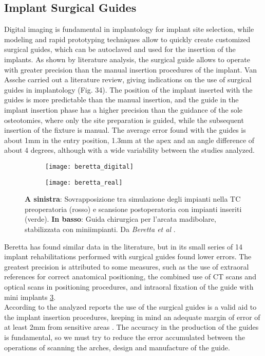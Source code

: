 \subsection{Implant Surgical Guides}
Digital imaging is fundamental in implantology for implant site selection, while modeling and rapid prototyping techniques allow to quickly create customized surgical guides, which can be autoclaved and used for the insertion of the \parencite{Reference83} implants. As shown by literature analysis, the surgical guide allows to operate with greater precision than the manual insertion procedures of the implant. Van Assche \parencite{Reference105} carried out a literature review, giving indications on the use of surgical guides in implantology (Fig. 34). The position of the implant inserted with the guides is more predictable than the manual insertion, and the guide in the implant insertion phase has a higher precision than the guidance of the sole osteotomies, where only the site preparation is guided, while the subsequent insertion of the fixture is manual. The average error found with the guides is about 1mm in the entry position, 1.3mm at the apex and an angle difference of about 4 degrees, although with a wide variability between the studies analyzed.

\begin{figure}[h!]
 
\begin{subfigure}{0.5\textwidth}
\centering
\texttt{[image: beretta\_digital]} 
\label{fig:beretta_digital}
\end{subfigure}
\begin{subfigure}{0.5\textwidth}
\centering
\texttt{[image: beretta\_real]}
\label{fig:beretta_real}
\end{subfigure}

\caption{\textbf{A sinistra}: Sovrapposizione tra simulazione degli impianti nella TC preoperatoria (rosso) e scansione postoperatoria con impianti inseriti (verde). \textbf{In basso}: Guida chirurgica per l'arcata madibolare, stabilizzata con miniimpianti. Da \emph{Beretta et al} \parencite{Reference104}.}
\label{fig:Beretta}
\end{figure}

Beretta \parencite{Reference104} has found similar data in the literature, but in its small series of 14 implant rehabilitations performed with surgical guides found lower errors. The greatest precision is attributed to some measures, such as the use of extraoral references for correct anatomical positioning, the combined use of CT scans and optical scans in positioning procedures, and intraoral fixation of the guide with mini implants \ref{fig:Beretta}. \\
According to the analyzed reports the use of the surgical guides is a valid aid to the implant insertion procedures, keeping in mind an adequate margin of error of at least 2mm from sensitive areas \parencite{Reference104}. The accuracy in the production of the guides is fundamental, so we must try to reduce the error accumulated between the operations of scanning the arches, design and manufacture of the guide.
 
